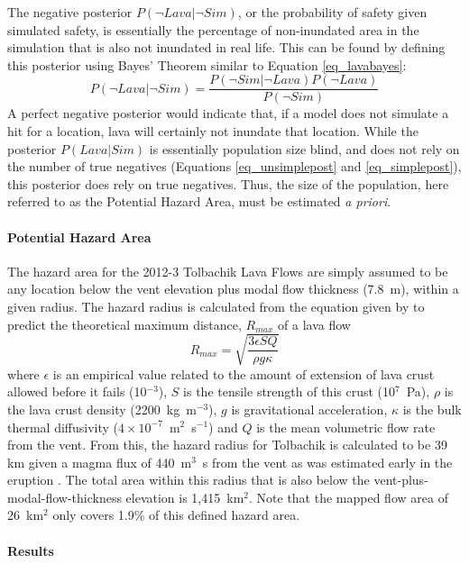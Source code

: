 \documentclass[12pt,letter]{article}
\begin{document}
The negative posterior $P(\neg Lava|\neg Sim)$, or the probability of safety given simulated safety, is essentially the percentage of non-inundated area in the simulation that is also not inundated in real life. This can be found by defining this posterior using Bayes' Theorem similar to Equation \ref{eq_lavabayes}:
\begin{equation}
P(\neg Lava|\neg Sim)=\frac{P(\neg Sim|\neg Lava)P(\neg Lava)}{P(\neg Sim)}
\end{equation}
A perfect negative posterior would indicate that, if a model does not simulate a hit for a location, lava will certainly not inundate that location. While the posterior $P(Lava|Sim)$ is essentially population size blind, and does not rely on the number of true negatives (Equations \ref{eq_unsimplepost} and \ref{eq_simplepost}), this posterior does rely on true negatives. Thus, the size of the population, here referred to as the Potential Hazard Area, must be estimated \textit{a priori}.

\paragraph{Potential Hazard Area} The hazard area for the 2012-3 Tolbachik Lava Flows are simply assumed to be any location below the vent elevation plus modal flow thickness (7.8~m), within a given radius. The hazard radius is calculated from the equation given by \citet{kilburn2000lava} to predict the theoretical maximum distance, $R_{max}$ of a lava flow
\begin{equation}
R_{max}=\sqrt{\frac{3\epsilon SQ}{\rho g\kappa}}
\end{equation}
where $\epsilon$ is an empirical value related to the amount of extension of lava crust allowed before it fails (10$^{-3}$), $S$ is the tensile strength of this crust (10$^7$~Pa), $\rho$ is the lava crust density (2200~kg~m$^{-3}$), $g$ is gravitational acceleration, $\kappa$ is the bulk thermal diffusivity ($4\times 10^{-7}$~m$^{2}$~s$^{-1}$) and $Q$ is the mean volumetric flow rate from the vent. From this, the hazard radius for Tolbachik is calculated to be 39 km given a magma flux of 440~m$^3$~s from the vent as was estimated early in the eruption \citep{belousov2015overview}. The total area within this radius that is also below the vent-plus-modal-flow-thickness elevation is 1,415~km$^2$. Note that the mapped flow area of 26~km$^2$ only covers 1.9\% of this defined hazard area.

\paragraph{Results}
\end{document}
